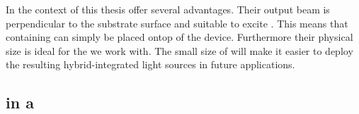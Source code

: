 		In the context of this thesis \VCSELs offer several advantages. Their output beam is perpendicular to the substrate surface and suitable to excite \sivs. This means that \nds containing \sivs can simply be placed ontop of the device. Furthermore their physical size is ideal for the \nds we work with. The small size of \VCSELs will make it easier to deploy the resulting hybrid-integrated light sources in future applications.

	\subsection{\siv in a \Vcsel}

